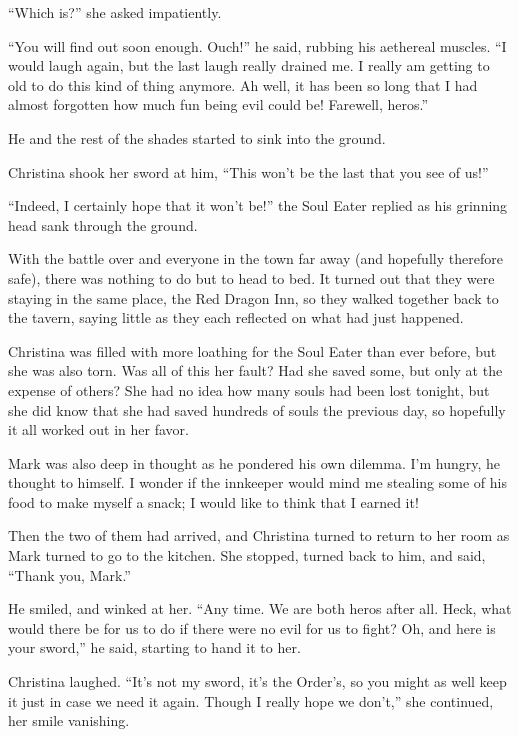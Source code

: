 \documentclass[showtrims,b6paper,draft,10pt]{memoir}
\begin{document}
``Which is?''  she asked impatiently.

``You will find out soon enough.  Ouch!'' he said, rubbing his aethereal muscles.  ``I would laugh again, but the last laugh really drained me.  I really am getting to old to do this kind of thing anymore.  Ah well, it has been so long that I had almost forgotten how much fun being evil could be!  Farewell, heros.''

He and the rest of the shades started to sink into the ground.

Christina shook her sword at him,  ``This won't be the last that you see of us!''

``Indeed, I certainly hope that it won't be!'' the Soul Eater replied as his grinning head sank through the ground.

\timeskip

With the battle over and everyone in the town far away (and hopefully therefore safe), there was nothing to do but to head to bed.  It turned out that they were staying in the same place, the Red Dragon Inn, so they walked together back to the tavern, saying little as they each reflected on what had just happened.

Christina was filled with more loathing for the Soul Eater than ever before, but she was also torn.  Was all of this her fault?  Had she saved some, but only at the expense of others?  She had no idea how many souls had been lost tonight, but she did know that she had saved hundreds of souls the previous day, so hopefully it all worked out in her favor.

Mark was also deep in thought as he pondered his own dilemma.  I'm hungry, he thought to himself.  I wonder if the innkeeper would mind me stealing some of his food to make myself a snack;  I would like to think that I earned it!

Then the two of them had arrived, and Christina turned to return to her room as Mark turned to go to the kitchen.  She stopped, turned back to him, and said, ``Thank you, Mark.''

He smiled, and winked at her.  ``Any time.  We are both heros after all.  Heck, what would there be for us to do if there were no evil for us to fight?  Oh, and here is your sword,''  he said, starting to hand it to her.

Christina laughed.  ``It's not my sword, it's the Order's, so you might as well keep it just in case we need it again.  Though I really hope we don't,'' she continued, her smile vanishing.
\end{document}
